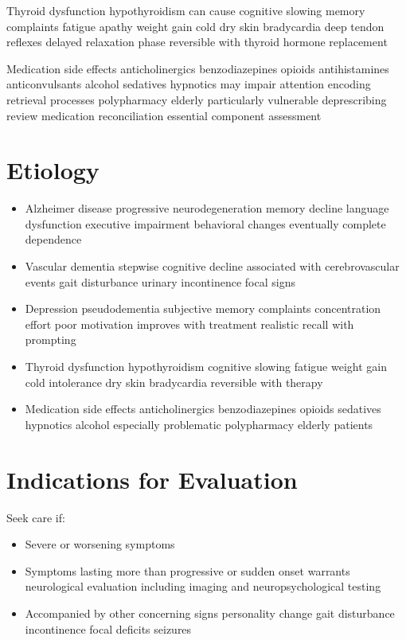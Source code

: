 Thyroid dysfunction hypothyroidism can cause cognitive slowing memory complaints fatigue apathy weight gain cold dry skin bradycardia deep tendon reflexes delayed relaxation phase reversible with thyroid hormone replacement

Medication side effects anticholinergics benzodiazepines opioids antihistamines anticonvulsants alcohol sedatives hypnotics may impair attention encoding retrieval processes polypharmacy elderly particularly vulnerable deprescribing review medication reconciliation essential component assessment

\section*{Etiology}
\begin{itemize}
  \item Alzheimer disease progressive neurodegeneration memory decline language dysfunction executive impairment behavioral changes eventually complete dependence
  \item Vascular dementia stepwise cognitive decline associated with cerebrovascular events gait disturbance urinary incontinence focal signs
  \item Depression pseudodementia subjective memory complaints concentration effort poor motivation improves with treatment realistic recall with prompting
  \item Thyroid dysfunction hypothyroidism cognitive slowing fatigue weight gain cold intolerance dry skin bradycardia reversible with therapy
  \item Medication side effects anticholinergics benzodiazepines opioids sedatives hypnotics alcohol especially problematic polypharmacy elderly patients
\end{itemize}

\section*{Indications for Evaluation}
Seek care if:
\begin{itemize}
  \item Severe or worsening symptoms
  \item Symptoms lasting more than progressive or sudden onset warrants neurological evaluation including imaging and neuropsychological testing
  \item Accompanied by other concerning signs personality change gait disturbance incontinence focal deficits seizures
\end{itemize}

